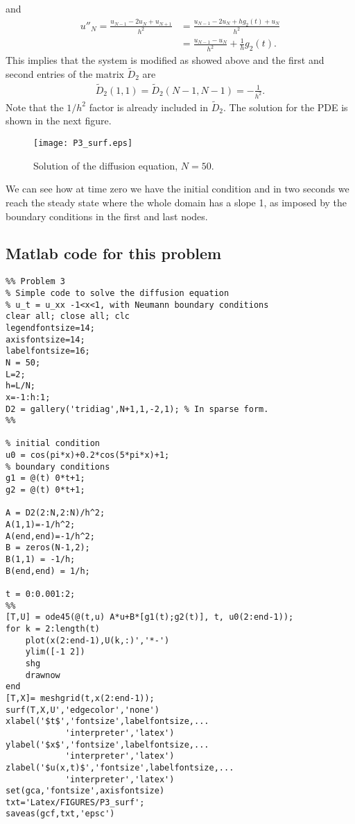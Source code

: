 and
\begin{align*}
u''_N=\frac{u_{N-1}-2u_N+u_{N+1}}{h^2}&=\frac{u_{N-1}-2u_N+hg_2(t)+u_N}{h^2}\\
&=\frac{u_{N-1}-u_N}{h^2}+\frac{1}{h} g_2(t).
\end{align*}
This implies that the system is modified as showed above and the first and second entries of the matrix $\tilde{D}_2$ are
\begin{align*}
\tilde{D}_2(1,1)=\tilde{D}_2(N-1,N-1)=-\frac{1}{h^2}.
\end{align*}
Note that the $1/h^2$ factor is already included in $\tilde{D}_2$. The solution for the PDE is shown in the next figure.
\begin{figure}[H]
\centering     %
{\texttt{[image: P3\_surf.eps]}}
\caption{Solution of the diffusion equation, $N=50$.}
\end{figure}
We can see how at time zero we have the initial condition and in two seconds we reach the steady state where the whole domain has a slope 1, as imposed by the boundary conditions in the first and last nodes.

\subsection*{Matlab code for this problem}
\begin{verbatim}
%% Problem 3
% Simple code to solve the diffusion equation
% u_t = u_xx -1<x<1, with Neumann boundary conditions
clear all; close all; clc
legendfontsize=14;
axisfontsize=14;
labelfontsize=16;
N = 50;
L=2;
h=L/N;
x=-1:h:1;
D2 = gallery('tridiag',N+1,1,-2,1); % In sparse form.
%%

% initial condition
u0 = cos(pi*x)+0.2*cos(5*pi*x)+1;
% boundary conditions
g1 = @(t) 0*t+1;
g2 = @(t) 0*t+1;

A = D2(2:N,2:N)/h^2;
A(1,1)=-1/h^2;
A(end,end)=-1/h^2;
B = zeros(N-1,2);
B(1,1) = -1/h;
B(end,end) = 1/h;

t = 0:0.001:2;
%%
[T,U] = ode45(@(t,u) A*u+B*[g1(t);g2(t)], t, u0(2:end-1));
for k = 2:length(t)
    plot(x(2:end-1),U(k,:)','*-')
    ylim([-1 2])
    shg
    drawnow
end
[T,X]= meshgrid(t,x(2:end-1));
surf(T,X,U','edgecolor','none')
xlabel('$t$','fontsize',labelfontsize,...
            'interpreter','latex')
ylabel('$x$','fontsize',labelfontsize,...
            'interpreter','latex')
zlabel('$u(x,t)$','fontsize',labelfontsize,...
            'interpreter','latex')
set(gca,'fontsize',axisfontsize)
txt='Latex/FIGURES/P3_surf';
saveas(gcf,txt,'epsc')
\end{verbatim}